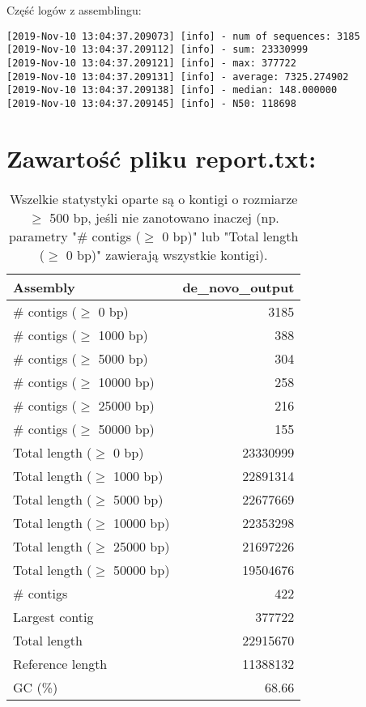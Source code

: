\documentclass[a4paper]{article}
\begin{document}
Część logów z assemblingu:
\begin{verbatim}
[2019-Nov-10 13:04:37.209073] [info] - num of sequences: 3185
[2019-Nov-10 13:04:37.209112] [info] - sum: 23330999
[2019-Nov-10 13:04:37.209121] [info] - max: 377722
[2019-Nov-10 13:04:37.209131] [info] - average: 7325.274902
[2019-Nov-10 13:04:37.209138] [info] - median: 148.000000
[2019-Nov-10 13:04:37.209145] [info] - N50: 118698
\end{verbatim}

\newpage
\begin{table}[ht]
\section{Zawartość pliku report.txt:}
\begin{center}
\caption{Wszelkie statystyki oparte są o kontigi o rozmiarze $\geq$ 500 bp, jeśli nie zanotowano inaczej (np. parametry "\# contigs ($\geq$ 0 bp)" lub "Total length ($\geq$ 0 bp)" zawierają wszystkie kontigi).
\label{fig:table1}
}
\begin{tabular}{|l*{1}{|r}|}
\hline
Assembly & de\_novo\_output \\ \hline
\# contigs ($\geq$ 0 bp) & 3185 \\ \hline
\# contigs ($\geq$ 1000 bp) & 388 \\ \hline
\# contigs ($\geq$ 5000 bp) & 304 \\ \hline
\# contigs ($\geq$ 10000 bp) & 258 \\ \hline
\# contigs ($\geq$ 25000 bp) &  216\\ \hline
\# contigs ($\geq$ 50000 bp) & 155 \\ \hline
Total length ($\geq$ 0 bp) & 23330999 \\ \hline
Total length ($\geq$ 1000 bp) & 22891314  \\ \hline
Total length ($\geq$ 5000 bp) & 22677669 \\ \hline
Total length ($\geq$ 10000 bp) & 22353298 \\ \hline
Total length ($\geq$ 25000 bp) & 21697226 \\ \hline
Total length ($\geq$ 50000 bp) & 19504676\\ \hline
\# contigs & 422 \\ \hline
Largest contig & 377722 \\ \hline
Total length  & 22915670 \\ \hline
Reference length & 11388132 \\ \hline
GC (\%) & 68.66 \\ \hline

\end{tabular}
\end{center}
\end{table}
\end{document}
